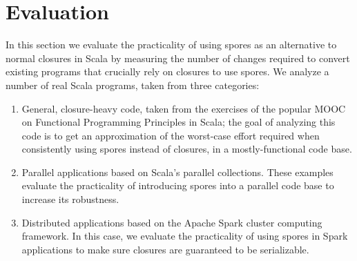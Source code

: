 \documentclass{llncs}
\begin{document}


\section{Evaluation}
\label{sec:evaluation}

%



In this section we evaluate the practicality of using spores as an alternative to normal closures in Scala by measuring the number of changes required to convert existing programs that crucially rely on closures to use spores. We analyze a number of real Scala programs, taken from three categories:
\begin{enumerate}

\item General, closure-heavy code, taken from the exercises of the popular MOOC on Functional Programming Principles in Scala; the goal of analyzing this code is to get an approximation of the worst-case effort required when consistently using spores instead of closures, in a mostly-functional code base.

\item Parallel applications based on Scala's parallel collections. These examples evaluate the practicality of introducing spores into a parallel code base to increase its robustness.

\item Distributed applications based on the Apache Spark cluster computing framework. In this case, we evaluate the practicality of using spores in Spark applications to make sure closures are guaranteed to be serializable.

\end{enumerate}
\end{document}
